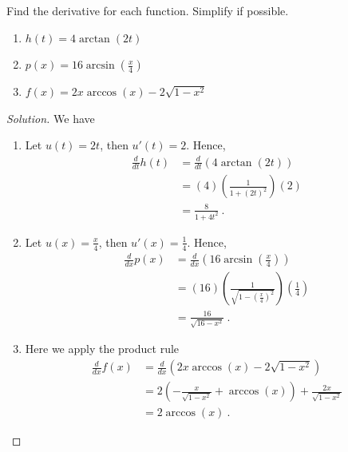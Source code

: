 \documentclass[compacto,10pt,comentarios]{aleph-notas}
\begin{document}
\begin{ejer}
    Find the derivative for each function. Simplify if possible.
    \begin{enumerate}
        \item $h(t) = 4\arctan(2t)$
        \item $p(x) = 16 \arcsin\left( \frac{x}{4} \right)$
        \item $f(x) = 2x\arccos(x) - 2 \sqrt{1 - x^2}$
    \end{enumerate}
\end{ejer}
\begin{proof}[Solution]
    We have
    \begin{enumerate}
        \item Let $u(t) = 2t$, then $u'(t) = 2$. Hence,
        \begin{align*}
            \frac{d}{dt} h(t) & = \frac{d}{dt} \left( 4 \arctan(2t) \right) \\
            & = \left( 4 \right) \left( \frac{1}{1 + (2t)^{2}} \right) \left( 2 \right) \\
            & = \frac{8}{1 + 4t^2} ~ .
        \end{align*}
        \item Let $u(x) = \frac{x}{4}$, then $u'(x) = \frac{1}{4}$. Hence,
        \begin{align*}
            \frac{d}{dx} p(x) & = \frac{d}{dx} \left( 16 \arcsin\left( \frac{x}{4} \right) \right) \\
            & = \left( 16 \right) \left(  \frac{1}{\sqrt{1 - \left( \frac{x}{4} \right)^{2} }} \right) \left( \frac{1}{4} \right) \\
            & = \frac{16}{\sqrt{16 - x^2}} ~ .
        \end{align*}
        \item Here we apply the product rule
        \begin{align*}
            \frac{d}{dx} f(x) & = \frac{d}{dx} \left( 2x\arccos(x) - 2 \sqrt{1 - x^2} \right) \\
            & = 2 \left(  -\frac{x}{\sqrt{1 - x^2}}  + \arccos(x) \right) + \frac{2x}{\sqrt{1-x^2}} \\
            & = 2 \arccos(x) ~ .
        \end{align*}
    \end{enumerate}
\end{proof}
\end{document}
